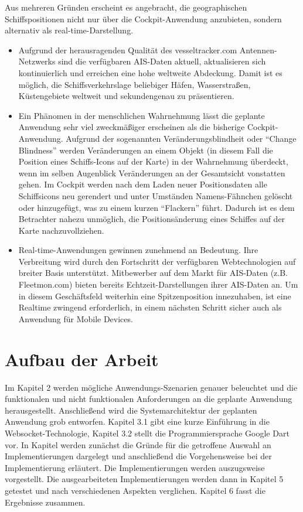 Aus mehreren Gründen erscheint es angebracht, die geographischen Schiffspositionen nicht nur über die Cockpit-Anwendung anzubieten, sondern alternativ als real-time-Darstellung. 
\begin{itemize}

\item Aufgrund der herausragenden Qualität des vesseltracker.com Antennen-Netzwerks sind die verfügbaren AIS-Daten aktuell, aktualisieren sich kontinuierlich und erreichen eine hohe weltweite Abdeckung. Damit ist es möglich, die Schiffsverkehrslage beliebiger Häfen, Wasserstraßen, Küstengebiete weltweit und sekundengenau zu präsentieren. 

\item Ein Phänomen in der menschlichen Wahrnehmung lässt die geplante Anwendung sehr viel zweckmäßiger erscheinen als die bisherige Cockpit-Anwendung. Aufgrund der sogenannten Veränderungsblindheit oder “Change Blindness” werden Veränderungen an einem Objekt (in diesem Fall die Position eines Schiffs-Icons auf der Karte) in der Wahrnehmung überdeckt, wenn im selben Augenblick Veränderungen an der Gesamtsicht vonstatten gehen. Im Cockpit werden nach dem Laden neuer Positionsdaten alle Schiffsicons neu gerendert und unter Umständen Namens-Fähnchen gelöscht oder hinzugefügt, was zu einem kurzen “Flackern” führt. Dadurch ist es dem Betrachter nahezu unmöglich, die Positionsänderung eines Schiffes auf der Karte nachzuvollziehen.
  
\item Real-time-Anwendungen gewinnen zunehmend an Bedeutung. Ihre Verbreitung wird durch den Fortschritt der verfügbaren Webtechnologien auf breiter Basis unterstützt. Mitbewerber auf dem Markt für AIS-Daten (z.B. Fleetmon.com) bieten bereits Echtzeit-Darstellungen ihrer AIS-Daten an. Um in diesem Geschäftsfeld weiterhin eine Spitzenposition innezuhaben, ist eine Realtime zwingend erforderlich, in einem nächsten Schritt sicher auch als Anwendung für Mobile Devices.
\end{itemize}


\section{Aufbau der Arbeit}\label{s.Aufbau der Arbeit}
Im Kapitel 2 werden mögliche Anwendungs-Szenarien genauer beleuchtet und die funktionalen und nicht funktionalen Anforderungen an die geplante Anwendung herausgestellt. Anschließend wird die Systemarchitektur der geplanten Anwendung grob entworfen.
Kapitel 3.1 gibt eine kurze Einführung in die Websocket-Technologie, Kapitel 3.2 stellt die Programmiersprache Google Dart vor.
In Kapitel werden zunächst die Gründe für die getroffene Auswahl an Implementierungen dargelegt und anschließend die Vorgehensweise bei der Implementierung erläutert. Die Implementierungen werden auszugsweise vorgestellt.
Die ausgearbeiteten Implementierungen werden dann in Kapitel 5 getestet und nach verschiedenen Aspekten verglichen.
Kapitel 6 fasst die Ergebnisse zusammen.

